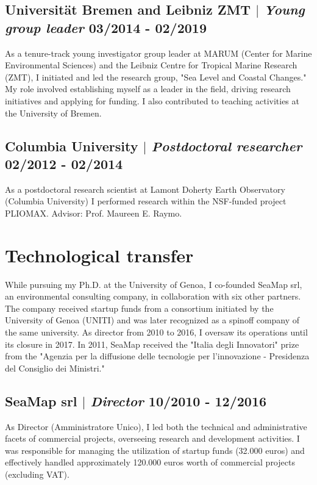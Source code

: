 \documentclass[11pt]{article}
\begin{document}
\subsection{Universität Bremen and Leibniz ZMT $|$ {\normalfont\textit{Young group leader}} \hfill 03/2014 - 02/2019}
{\footnotesize As a tenure-track young investigator group leader at MARUM (Center for Marine Environmental Sciences) and the Leibniz Centre for Tropical Marine Research (ZMT), I initiated and led the research group, "Sea Level and Coastal Changes." My role involved establishing myself as a leader in the field, driving research initiatives and applying for funding. I also contributed to teaching activities at the University of Bremen.}
\bigskip

\subsection{Columbia University $|$ {\normalfont\textit{Postdoctoral researcher}} \hfill 02/2012 - 02/2014}
{\footnotesize As a postdoctoral research scientist at Lamont Doherty Earth Observatory (Columbia University) I performed research within the NSF-funded project PLIOMAX. Advisor: Prof. Maureen E. Raymo.}
\bigskip

\section{Technological transfer}
{\normalfont While pursuing my Ph.D. at the University of Genoa, I co-founded SeaMap srl, an environmental consulting company, in collaboration with six other partners. The company received startup funds from a consortium initiated by the University of Genoa (UNITI) and was later recognized as a spinoff company of the same university. As director from 2010 to 2016, I oversaw its operations until its closure in 2017. In 2011, SeaMap received the "Italia degli Innovatori" prize from the "Agenzia per la diffusione delle tecnologie per l’innovazione - Presidenza del Consiglio dei Ministri."}\\
\bigskip
\subsection{SeaMap srl  $|$ {\normalfont\textit{Director}} \hfill 10/2010 - 12/2016}
{\footnotesize As Director (Amministratore Unico), I led both the technical and administrative facets of commercial projects, overseeing research and development activities. I was responsible for managing the utilization of startup funds (32.000 euros) and effectively handled approximately 120.000 euros worth of commercial projects (excluding VAT).}
\bigskip
\end{document}
